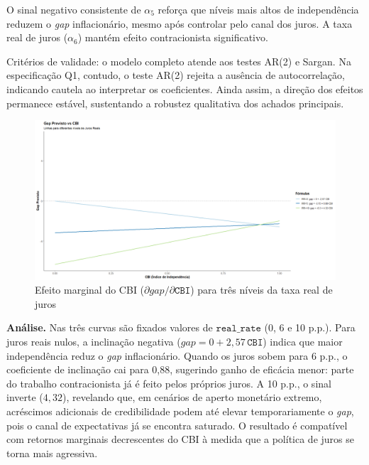 \documentclass[a4paper,12pt]{article}[abnt2]
\begin{document}
O sinal negativo consistente de \(\alpha_{5}\) reforça que níveis mais altos
de independência reduzem o \textit{gap} inflacionário, mesmo após controlar
pelo canal dos juros. A taxa real de juros (\(\alpha_{6}\)) mantém efeito
contracionista significativo.

Critérios de validade: o modelo completo atende aos testes AR(2) e Sargan.
Na especificação Q1, contudo, o teste AR(2) rejeita a ausência de
autocorrelação, indicando cautela ao interpretar os coeficientes. Ainda
assim, a direção dos efeitos permanece estável, sustentando a robustez
qualitativa dos achados principais.

\begin{figure}[H]
    \centering
    \caption{Efeito marginal do CBI (\(\partial\textit{gap}/\partial\texttt{CBI}\)) para três níveis da taxa real de juros}
    \label{fig:marg_cbi}
    \includegraphics[width=.85\linewidth]{Imagens/ai1i1.png}
\end{figure}

\begin{flushleft}\small
\textbf{Análise.}  Nas três curvas são fixados valores de \(\texttt{real\_rate}\) (0, 6 e 10 p.p.).  
Para juros reais nulos, a inclinação negativa (\(\textit{gap}=0+2{,}57\,\texttt{CBI}\)) indica que maior independência reduz o \textit{gap} inflacionário.  
Quando os juros sobem para 6 p.p., o coeficiente de inclinação cai para 0,88, sugerindo ganho de eficácia menor: parte do trabalho contracionista já é feito pelos próprios juros.  
A 10 p.p., o sinal inverte (\(4{,}32\)), revelando que, em cenários de aperto monetário extremo, acréscimos adicionais de credibilidade podem até elevar temporariamente o \textit{gap}, pois o canal de expectativas já se encontra saturado.  
O resultado é compatível com retornos marginais decrescentes do CBI à medida que a política de juros se torna mais agressiva.
\end{flushleft}
\end{document}
